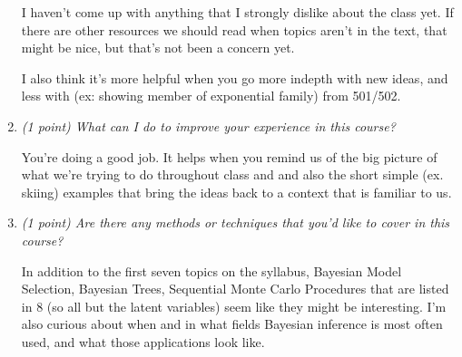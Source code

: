\documentclass{article}\usepackage[]{graphicx}\usepackage[]{color}
\begin{document}
\begin{enumerate}
I haven't come up with anything that I strongly dislike about the class yet. If there are other resources we should read when topics aren't in the text, that might be nice, but that's not been a concern yet.

I also think it's more helpful when you go more indepth with new ideas, and less with (ex: showing member of exponential family) from 501/502.

\item%
{\it (1 point) What can I do to improve your experience in this course?}

You're doing a good job. It helps when you remind us of the big picture of what we're trying to do throughout class and and also the short simple (ex. skiing) examples that bring the ideas back to a context that is familiar to us.

\item%
{\it (1 point) Are there any methods or techniques that you'd like to cover in this course?}

In addition to the first seven topics on the syllabus, Bayesian Model Selection, Bayesian Trees,
Sequential Monte Carlo Procedures that are listed in 8 (so all but the latent variables) seem like they might be interesting. I'm also curious about when and in what fields Bayesian inference is most often used, and what those applications look like.
\end{enumerate}
\end{document}
